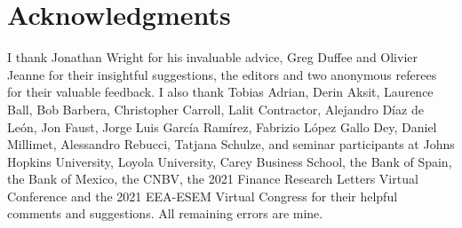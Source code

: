 \documentclass[a4paper, 12pt]{article}
\begin{document}
\section*{Acknowledgments}
\begin{spacing}{1.25} 
I thank Jonathan Wright for his invaluable advice, Greg Duffee and Olivier Jeanne for their insightful suggestions, the editors and two anonymous referees for their valuable feedback. I also thank Tobias Adrian, Derin Aksit, Laurence Ball, Bob Barbera, Christopher Carroll, Lalit Contractor, Alejandro Díaz de León, Jon Faust, Jorge Luis García Ramírez, Fabrizio López Gallo Dey, Daniel Millimet, Alessandro Rebucci, Tatjana Schulze, and seminar participants at Johns Hopkins University, Loyola University, Carey Business School, the Bank of Spain, the Bank of Mexico, the CNBV, the 2021 Finance Research Letters Virtual Conference and the 2021 EEA-ESEM Virtual Congress for their helpful comments and suggestions. All remaining errors are mine. %
\end{spacing}

\newpage

	
\end{document}
